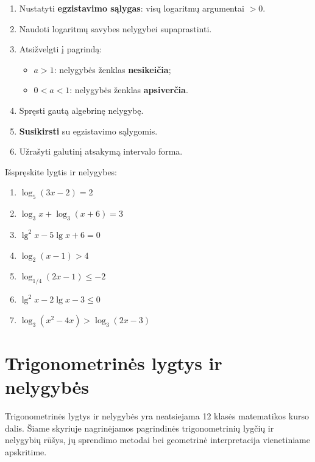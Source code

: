 \begin{tcolorbox}[title={Logaritminių nelygybių sprendimo algoritmas}]
\begin{enumerate}
    \item Nustatyti \textbf{egzistavimo sąlygas}: visų logaritmų argumentai $> 0$.
    \item Naudoti logaritmų savybes nelygybei supaprastinti.
    \item Atsižvelgti į pagrindą:
    \begin{itemize}
        \item $a > 1$: nelygybės ženklas \textbf{nesikeičia};
        \item $0 < a < 1$: nelygybės ženklas \textbf{apsiverčia}.
    \end{itemize}
    \item Spręsti gautą algebrinę nelygybę.
    \item \textbf{Susikirsti} su egzistavimo sąlygomis.
    \item Užrašyti galutinį atsakymą intervalo forma.
\end{enumerate}
\end{tcolorbox}

\begin{exercise}
Išspręskite lygtis ir nelygybes:
\begin{enumerate}[label=\alph*)]
    \item $\log_5(3x - 2) = 2$
    \item $\log_3 x + \log_3(x + 6) = 3$
    \item $\lg^2 x - 5\lg x + 6 = 0$
    \item $\log_2(x - 1) > 4$
    \item $\log_{1/4}(2x - 1) \leq -2$
    \item $\lg^2 x - 2\lg x - 3 \leq 0$
    \item $\log_3(x^2 - 4x) > \log_3(2x - 3)$
\end{enumerate}
\end{exercise}

\section{Trigonometrinės lygtys ir nelygybės}

Trigonometrinės lygtys ir nelygybės yra neatsiejama 12 klasės matematikos kurso dalis. 
Šiame skyriuje nagrinėjamos pagrindinės trigonometrinių lygčių ir nelygybių rūšys, 
jų sprendimo metodai bei geometrinė interpretacija vienetiniame apskritime.

